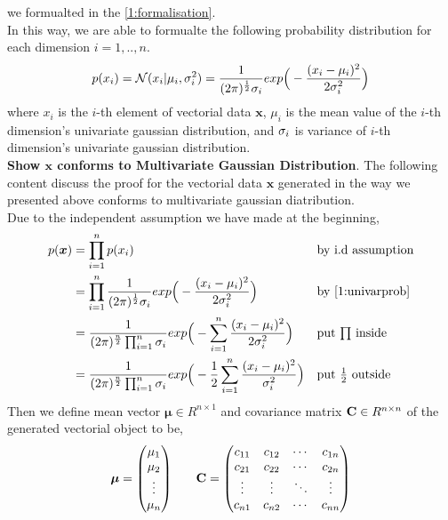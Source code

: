 \documentclass[11pt,a4paper]{article}
\newcommand{\htab}{\hspace*{0.63cm}}
\newcommand{\bs}[1]{\boldsymbol{#1}}
\newcommand{\pg}{\\[0.3cm]}
\newcommand{\bmu}{\boldsymbol{\mu}}
\newcommand{\bx}{\boldsymbol{x}}
\newcommand{\N}{\mathcal{N}}
\newcommand{\half}{\frac{1}{2}}
\begin{document}
we formualted in the \eqref{1:formalisation}.\\
\htab In this way, we are able to formualte the following probability distribution
for each dimension $i = 1,..,n$.
    \begin{align}
        p (x_{i}) = \N (x_{i} | \mui, \sigmai^{2}) 
        = \frac{1}{(2\pi)^{\frac{1}{2}} \sigmai} 
        exp\Big( -\frac{(x_{i} - \mui )^{2}}{2\sigmai^{2}} \Big) \label{1:univarprob}
    \end{align}
\htab where $x_{i}$ is the $i$-th element of vectorial data $\bs{x}$, $\mu_{i}$ is the mean value
of the $i$-th dimension's univariate gaussian distribution, and $\sigma_{i}$ is variance of $i$-th dimension's 
univariate gaussian distribution. \pg
\htab \textbf{Show $\bs{x}$ conforms to Multivariate Gaussian Distribution}.
The following content discuss the proof for the vectorial data $\bs{x}$ generated in the 
way we presented above conforms to multivariate gaussian diatribution.\\
\htab Due to the independent assumption we have made at the beginning, 
\begin{align}
    p(\bx) &= \prod_{i=1}^{n} p(x_{i}) &&\mbox{by i.d assumption} \\
    & = \prod_{i=1}^{n} \frac{1} {(2\pi)^{ \frac{1}{2}} \sigmai} 
    exp\Big( -\frac{(x_{i} - \mui)^{2}}{2\sigmai^{2}} \Big) &&\mbox{by \eqref{1:univarprob}} \\
    & = \frac{1}{(2\pi)^{\frac{n}{2}} \prod_{i=1}^{n}\sigmai}
        exp\Big( - \sum_{i=1}^{n} \frac{(x_{i} - \mui)^{2}}{2\sigmai^{2}}  \Big) 
        &&\mbox{put $\prod$ inside}\\
    & = \frac{1}{(2\pi)^{\frac{n}{2}} \prod_{i=1}^{n}\sigmai}
        exp\Big( - \half \sum_{i=1}^{n} \frac{(x_{i} - \mui)^{2}}{\sigmai^{2}}  \Big)
        &&\mbox{put $\half$ outside} \label{1:pximmediate}
        \end{align}
\htab Then we define mean vector $\bmu \in R^{n\times 1}$ and covariance matrix $\mathbf{C} \in R^{n\times n}$ 
of the generated vectorial object to be,
    \begin{align} 
        \bmu = \begin{pmatrix} \mu_{1} \\ \mu_{2} \\ \vdots \\ \mu_{n}  \end{pmatrix}
        \htab
        \C = \begin{pmatrix}
            c_{11} & c_{12} & \cdots & c_{1n} \\
            c_{21} & c_{22} & \cdots & c_{2n} \\
            \vdots & \vdots & \ddots & \vdots \\
            c_{n1} & c_{n2} & \cdots & c_{nn}
        \end{pmatrix}
    \end{align}
\end{document}
